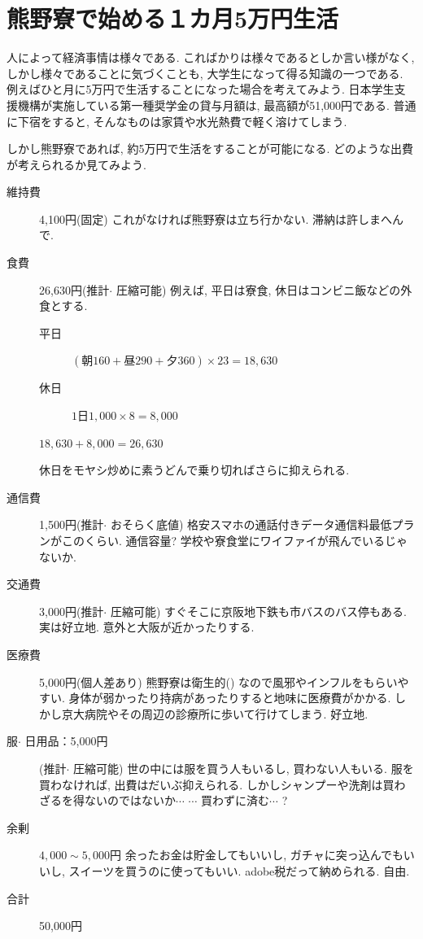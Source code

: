 \documentclass[10pt,b5jsbook,dvips,dvipdfmx,openany]{jsbook}
\theoremstyle{definition}
\begin{document}
	
		

	\section{熊野寮で始める１カ月5万円生活}
	人によって経済事情は様々である. こればかりは様々であるとしか言い様がなく, しかし様々であることに気づくことも, 大学生になって得る知識の一つである. 例えばひと月に5万円で生活することになった場合を考えてみよう. 日本学生支援機構が実施している第一種奨学金の貸与月額は, 最高額が51,000円である. 普通に下宿をすると, そんなものは家賃や水光熱費で軽く溶けてしまう. 

	しかし熊野寮であれば, 約5万円で生活をすることが可能になる. どのような出費が考えられるか見てみよう. 
	\begin{description}
	\item[維持費] 4,100円(固定)
	これがなければ熊野寮は立ち行かない. 滞納は許しまへんで. 
	\item[食費] 26,630円(推計$ \cdot $ 圧縮可能) 
	例えば, 平日は寮食, 休日はコンビニ飯などの外食とする. 
		\begin{description}
		\item[平日]  $(朝160+昼290+夕360) \times 23=18,630 $ 
		\item[休日] $1日1,000 \times 8=8,000 $ 
		\end{description}
	$ 18,630 + 8,000 = 26,630 $ 
	
	休日をモヤシ炒めに素うどんで乗り切ればさらに抑えられる. 
	\item[通信費] 1,500円(推計$ \cdot $ おそらく底値)
	格安スマホの通話付きデータ通信料最低プランがこのくらい. 
	通信容量? 学校や寮食堂にワイファイが飛んでいるじゃないか. 
	\item[交通費] 3,000円(推計$ \cdot $ 圧縮可能)
	すぐそこに京阪地下鉄も市バスのバス停もある. 実は好立地. 
	意外と大阪が近かったりする. 
	\item[医療費] 5,000円(個人差あり) 
	熊野寮は衛生的() なので風邪やインフルをもらいやすい. 
	身体が弱かったり持病があったりすると地味に医療費がかかる. 
	しかし京大病院やその周辺の診療所に歩いて行けてしまう. 好立地. 
	\item[服$ \cdot $ 日用品：5,000円](推計$ \cdot $ 圧縮可能) 
	世の中には服を買う人もいるし, 買わない人もいる. 
服を買わなければ, 出費はだいぶ抑えられる. 
しかしシャンプーや洗剤は買わざるを得ないのではないか$ \cdots $ $ \cdots $ 買わずに済む$ \cdots $ ? 
	\item[余剰] $ 4,000 \sim 5,000円 $ 
	余ったお金は貯金してもいいし, ガチャに突っ込んでもいいし, スイーツを買うのに使ってもいい. adobe税だって納められる. 自由. 
	\item[合計] 50,000円
	\end{description}
\end{document}
